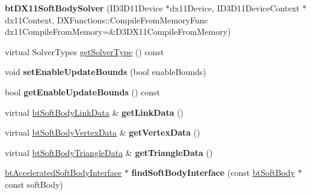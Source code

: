 \begin{DoxyCompactItemize}
\item 
\hypertarget{classbt_d_x11_soft_body_solver_a252664ab4df3d33392675e25f2499811}{{\bfseries bt\+D\+X11\+Soft\+Body\+Solver} (I\+D3\+D11\+Device $\ast$dx11\+Device, I\+D3\+D11\+Device\+Context $\ast$dx11\+Context, D\+X\+Functions\+::\+Compile\+From\+Memory\+Func dx11\+Compile\+From\+Memory=\&D3\+D\+X11\+Compile\+From\+Memory)}\label{classbt_d_x11_soft_body_solver_a252664ab4df3d33392675e25f2499811}

\item 
virtual Solver\+Types \hyperlink{classbt_d_x11_soft_body_solver_a582e9b300af1c062c6189071c05bcca0}{get\+Solver\+Type} () const 
\item 
\hypertarget{classbt_d_x11_soft_body_solver_ad84c9f5da1e1971c11882dd91f4d0f2b}{void {\bfseries set\+Enable\+Update\+Bounds} (bool enable\+Bounds)}\label{classbt_d_x11_soft_body_solver_ad84c9f5da1e1971c11882dd91f4d0f2b}

\item 
\hypertarget{classbt_d_x11_soft_body_solver_a60ffbb022bc95433b8fe96d2129cf5b1}{bool {\bfseries get\+Enable\+Update\+Bounds} () const }\label{classbt_d_x11_soft_body_solver_a60ffbb022bc95433b8fe96d2129cf5b1}

\item 
\hypertarget{classbt_d_x11_soft_body_solver_ad4b1641c8506046e28f13a404a004314}{virtual \hyperlink{classbt_soft_body_link_data}{bt\+Soft\+Body\+Link\+Data} \& {\bfseries get\+Link\+Data} ()}\label{classbt_d_x11_soft_body_solver_ad4b1641c8506046e28f13a404a004314}

\item 
\hypertarget{classbt_d_x11_soft_body_solver_a8fa697c8f3c040b2df1afd35b903efa1}{virtual \hyperlink{classbt_soft_body_vertex_data}{bt\+Soft\+Body\+Vertex\+Data} \& {\bfseries get\+Vertex\+Data} ()}\label{classbt_d_x11_soft_body_solver_a8fa697c8f3c040b2df1afd35b903efa1}

\item 
\hypertarget{classbt_d_x11_soft_body_solver_a3bf966f69827fec447bcb2577f66eb1c}{virtual \hyperlink{classbt_soft_body_triangle_data}{bt\+Soft\+Body\+Triangle\+Data} \& {\bfseries get\+Triangle\+Data} ()}\label{classbt_d_x11_soft_body_solver_a3bf966f69827fec447bcb2577f66eb1c}

\item 
\hypertarget{classbt_d_x11_soft_body_solver_a7d1e59a8d3a1326415a179cd77720019}{\hyperlink{classbt_d_x11_soft_body_solver_1_1bt_accelerated_soft_body_interface}{bt\+Accelerated\+Soft\+Body\+Interface} $\ast$ {\bfseries find\+Soft\+Body\+Interface} (const \hyperlink{classbt_soft_body}{bt\+Soft\+Body} $\ast$const soft\+Body)}\label{classbt_d_x11_soft_body_solver_a7d1e59a8d3a1326415a179cd77720019}


\end{DoxyCompactItemize}
